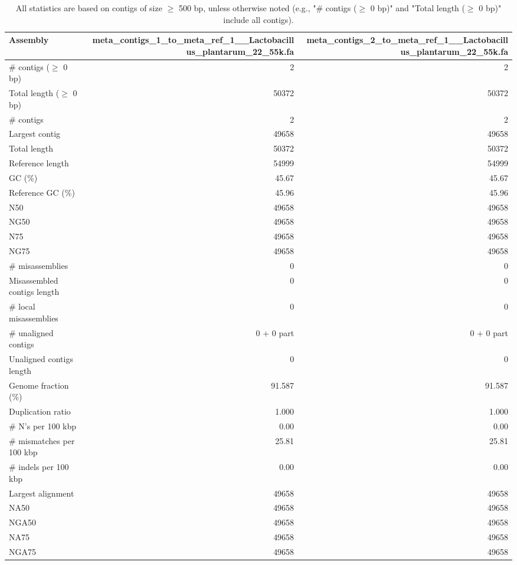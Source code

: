 \documentclass[12pt,a4paper]{article}
\begin{document}
\begin{table}[ht]
\begin{center}
\caption{All statistics are based on contigs of size $\geq$ 500 bp, unless otherwise noted (e.g., "\# contigs ($\geq$ 0 bp)" and "Total length ($\geq$ 0 bp)" include all contigs).}
\begin{tabular}{|l*{2}{|r}|}
\hline
Assembly & meta\_contigs\_1\_to\_meta\_ref\_1\_\_Lactobacillus\_plantarum\_22\_55k.fa & meta\_contigs\_2\_to\_meta\_ref\_1\_\_Lactobacillus\_plantarum\_22\_55k.fa \\ \hline
\# contigs ($\geq$ 0 bp) & 2 & 2 \\ \hline
Total length ($\geq$ 0 bp) & 50372 & 50372 \\ \hline
\# contigs & 2 & 2 \\ \hline
Largest contig & 49658 & 49658 \\ \hline
Total length & 50372 & 50372 \\ \hline
Reference length & 54999 & 54999 \\ \hline
GC (\%) & 45.67 & 45.67 \\ \hline
Reference GC (\%) & 45.96 & 45.96 \\ \hline
N50 & 49658 & 49658 \\ \hline
NG50 & 49658 & 49658 \\ \hline
N75 & 49658 & 49658 \\ \hline
NG75 & 49658 & 49658 \\ \hline
\# misassemblies & 0 & 0 \\ \hline
Misassembled contigs length & 0 & 0 \\ \hline
\# local misassemblies & 0 & 0 \\ \hline
\# unaligned contigs & 0 + 0 part & 0 + 0 part \\ \hline
Unaligned contigs length & 0 & 0 \\ \hline
Genome fraction (\%) & 91.587 & 91.587 \\ \hline
Duplication ratio & 1.000 & 1.000 \\ \hline
\# N's per 100 kbp & 0.00 & 0.00 \\ \hline
\# mismatches per 100 kbp & 25.81 & 25.81 \\ \hline
\# indels per 100 kbp & 0.00 & 0.00 \\ \hline
Largest alignment & 49658 & 49658 \\ \hline
NA50 & 49658 & 49658 \\ \hline
NGA50 & 49658 & 49658 \\ \hline
NA75 & 49658 & 49658 \\ \hline
NGA75 & 49658 & 49658 \\ \hline
\end{tabular}
\end{center}
\end{table}
\end{document}
